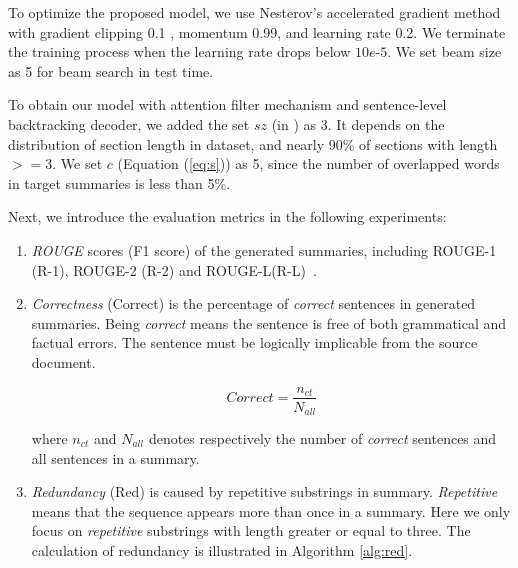 To optimize the proposed model,
we use Nesterov's
accelerated gradient method \cite{SutskeverMDH13} with gradient clipping 0.1 \cite{PascanuMB13}, momentum 0.99,
and learning rate 0.2.
We terminate the training process when the learning rate drops below $10e$-$5$.
We set beam size as 5 for beam search in test time.

To obtain our model with attention filter mechanism and 
sentence-level backtracking decoder, we added the
set $sz$ (in ) as 3.
It depends on the distribution of 
section length in dataset, and nearly 90\% 
of sections with length$>=$3.
We set $c$ (Equation (\ref{eq:s})) as 5,
since the number of overlapped words in target summaries 
is less than 5\%.

Next, we introduce the evaluation metrics in the following experiments:
\begin{enumerate}
\item \textit{ROUGE} scores (F1 score) of the generated
summaries, including ROUGE-1 (R-1), ROUGE-2 (R-2) and
ROUGE-L(R-L)~\cite{rouge-a-package-for-automatic-evaluation-of-summaries}.

\item \textit{Correctness} (Correct) is the percentage of
\textit{correct} sentences in generated summaries.
Being \textit{correct} means the sentence is free of both grammatical and factual errors. The sentence must be logically implicable from the source document.

\begin{equation}
Correct = \frac{n_{ct}}{N_{all}}
\end{equation}

where $n_{ct}$ and $N_{all}$ denotes respectively
the number of \textit{correct} sentences and all sentences 
in a summary.

\item \textit{Redundancy} (Red) is caused by
repetitive substrings in summary. \textit{Repetitive} means that the sequence appears more than once in a summary. Here we only focus on \textit{repetitive} substrings with length greater or equal to three.
The calculation of redundancy is illustrated in Algorithm \ref{alg:red}.


\end{enumerate}
